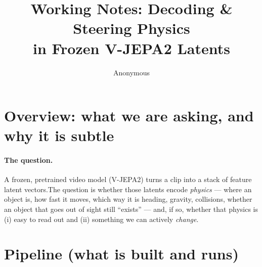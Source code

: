 \documentclass{article} %
\title{Working Notes: Decoding \& Steering Physics\\ in Frozen V-JEPA2 Latents}
\author{Anonymous}
\newcommand{\vjepa}{V-JEPA2}
\begin{document}
\maketitle


\section{Overview: what we are asking, and why it is subtle}

\paragraph{The question.}
A frozen, pretrained video model (\vjepa{}) turns a clip into a stack of feature latent vectors.The question is whether those latents encode \emph{physics} --- where an object is, how fast it moves, which way it is heading,
gravity, collisions, whether an object that goes out of sight still ``exists'' --- and, if so, whether
that physics is (i) easy to read out and (ii) something we can actively \emph{change}.

\section{Pipeline (what is built and runs)}
\label{sec:pipeline}
\end{document}
